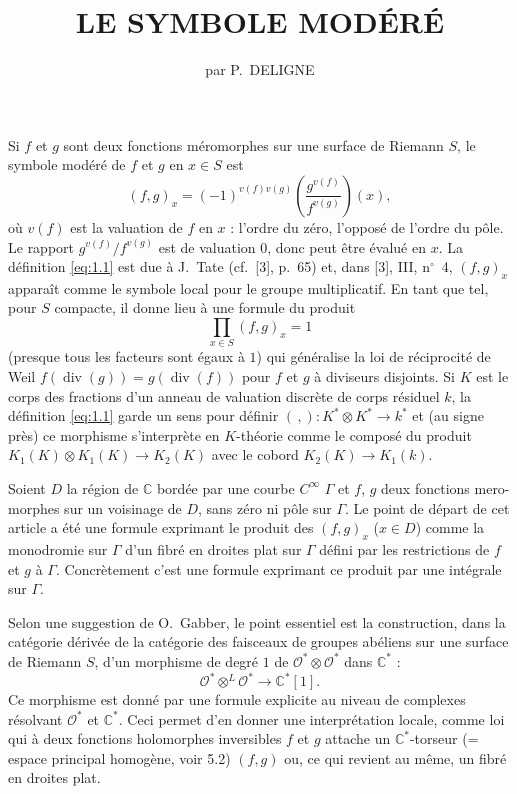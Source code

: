 \documentclass[12pt,a4paper]{article}
\title{\textbf{LE SYMBOLE MODÉRÉ}}
\author{par P.~DELIGNE}
\date{}
\theoremstyle{plain}
\theoremstyle{definition}
\theoremstyle{remark}
\newcommand{\cO}{\mathcal{O}}
\newcommand{\C}{\mathbb{C}}
\providecommand{\cO}{\mathcal{O}}
\begin{document}
\maketitle
\thispagestyle{empty}

Si $f$ et $g$ sont deux fonctions méromorphes sur une surface de Riemann $S$, le symbole
modéré de $f$ et $g$ en $x \in S$ est
\begin{equation}\label{eq:1.1}
(f,g)_x = (-1)^{v(f)v(g)}\left(\frac{g^{v(f)}}{f^{v(g)}}\right)(x),
\end{equation}
où $v(f)$ est la valuation de $f$ en $x$ : l'ordre du zéro, l'opposé de l'ordre du pôle. Le rapport $g^{v(f)}/f^{v(g)}$ est de valuation $0$, donc peut être évalué en $x$. La définition \eqref{eq:1.1} est due
à J.~Tate (cf.~[3], p.~65) et, dans [3], III, n${}^\circ$~4, $(f,g)_x$ apparaît comme le symbole local
pour le groupe multiplicatif. En tant que tel, pour $S$ compacte, il donne lieu à une formule
du produit
\begin{equation}\label{eq:1.2}
\prod_{x \in S} (f,g)_x = 1
\end{equation}
(presque tous les facteurs sont égaux à $1$) qui généralise la loi de réciprocité de Weil
$f(\operatorname{div}(g)) = g(\operatorname{div}(f))$ pour $f$ et $g$ à diviseurs disjoints. Si $K$ est le corps des fractions d'un
anneau de valuation discrète de corps résiduel $k$, la définition \eqref{eq:1.1} garde un sens pour
définir $(\,,) : K^* \otimes K^* \to k^*$ et (au signe près) ce morphisme s'interprète en $K$-théorie
comme le composé du produit $K_1(K) \otimes K_1(K) \to K_2(K)$ avec le cobord $K_2(K) \to K_1(k)$.

Soient $D$ la région de $\C$ bordée par une courbe $C^\infty$ $\Gamma$ et $f$, $g$ deux fonctions mero-
morphes sur un voisinage de $D$, sans zéro ni pôle sur $\Gamma$. Le point de départ de cet article
a été une formule exprimant le produit des $(f,g)_x$ ($x \in D$) comme la monodromie sur $\Gamma$
d'un fibré en droites plat sur $\Gamma$ défini par les restrictions de $f$ et $g$ à $\Gamma$. Concrètement
c'est une formule exprimant ce produit par une intégrale sur $\Gamma$.

Selon une suggestion de O.~Gabber, le point essentiel est la construction, dans la
catégorie dérivée de la catégorie des faisceaux de groupes abéliens sur une surface de
Riemann $S$, d'un morphisme de degré $1$ de $\cO^* \otimes \cO^*$ dans $\C^*$ :
\begin{equation}\label{eq:1.3}
\cO^* \otimes^L \cO^* \to \C^*[1].
\end{equation}
Ce morphisme est donné par une formule explicite au niveau de complexes résolvant $\cO^*$
et $\C^*$. Ceci permet d'en donner une interprétation locale, comme loi qui à deux fonctions
holomorphes inversibles $f$ et $g$ attache un $\C^*$-torseur (= espace principal homogène,
voir 5.2) $(f,g)$ ou, ce qui revient au même, un fibré en droites plat.
\end{document}
